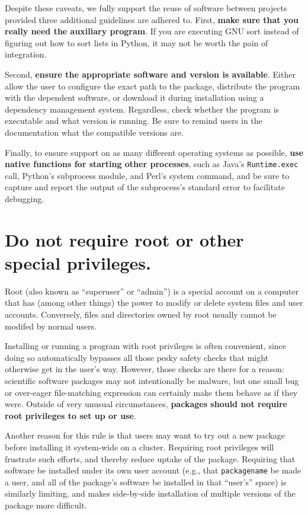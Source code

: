 \documentclass[10pt,letterpaper]{article}
\begin{document}
Despite these caveats,
we fully support the reuse of software between projects provided
three additional guidelines are adhered to. First, 
\textbf{make sure that you really need the auxiliary program}. If you are
executing GNU sort instead of figuring out how to sort lists in Python,
it may not be worth the pain of integration.

Second, \textbf{ensure the appropriate software and version is available}.
Either allow the user to
configure the exact path to the package, distribute the program with the
dependent software, or download it during installation using a
dependency management system. Regardless, check whether the program is
executable and what version is running. Be sure to remind users in the
documentation what the compatible versions are.

Finally, to ensure support on as many different operating systems as
possible, \textbf{use native functions for starting other processes}, such as
Java's \texttt{Runtime.exec} call, Python's subprocess module, and Perl's system
command, and be sure to capture and report the output of the subprocess's standard error
to facilitate debugging.

\section{Do not require root or other special privileges.}

Root (also known as ``superuser'' or ``admin'') is a special account on
a computer that has (among other things) the power to modify or delete
system files and user accounts. Conversely, files and directories owned
by root usually cannot be modifed by normal users.

Installing or running a program with root privileges is often
convenient, since doing so automatically bypasses all those pesky safety
checks that might otherwise get in the user's way. However, those checks
are there for a reason: scientific software packages may not
intentionally be malware, but one small bug or over-eager file-matching
expression can certainly make them behave as if they were. Outside of
very unusual circumstances,
\textbf{packages should not require root privileges to set up or use}.

Another reason for this rule is that users may want to try out a new
package before installing it system-wide on a cluster. Requiring root
privileges will frustrate such efforts, and thereby reduce uptake of the
package. Requiring that software be installed under its own user account
(e.g., that \texttt{packagename} be made a user, and all of the
package's software be installed in that ``user's'' space) is similarly
limiting, and makes side-by-side installation of multiple versions of
the package more difficult.
\end{document}
